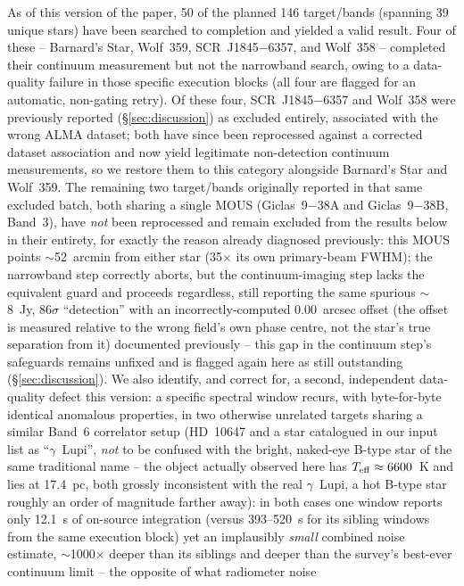 \documentclass{openjournal}
\begin{document}
As of this version of the paper, 50 of the planned 146 target/bands
(spanning 39 unique stars) have been searched to completion and yielded
a valid result. Four of these -- Barnard's Star, Wolf~359,
SCR~J1845$-$6357, and Wolf~358 -- completed their continuum measurement
but not the narrowband search, owing to a data-quality failure in those
specific execution blocks (all four are flagged for an automatic,
non-gating retry). Of these four, SCR~J1845$-$6357 and Wolf~358 were
previously reported (\S\ref{sec:discussion}) as excluded entirely,
associated with the wrong ALMA dataset; both have since been reprocessed
against a corrected dataset association and now yield legitimate
non-detection continuum measurements, so we restore them to this
category alongside Barnard's Star and Wolf~359. The remaining two
target/bands originally reported in that same excluded batch, both
sharing a single MOUS (Giclas~9$-$38A and Giclas~9$-$38B, Band~3), have
\emph{not} been reprocessed and remain excluded from the results below
in their entirety, for exactly the reason already diagnosed previously:
this MOUS points $\sim$52~arcmin from either star (35$\times$ its own
primary-beam FWHM); the narrowband step correctly aborts, but the
continuum-imaging step lacks the equivalent guard and proceeds
regardless, still reporting the same spurious $\sim$8~Jy, 86$\sigma$
``detection'' with an incorrectly-computed 0.00~arcsec offset (the
offset is measured relative to the wrong field's own phase centre, not
the star's true separation from it) documented previously -- this gap in
the continuum step's safeguards remains unfixed and is flagged again
here as still outstanding (\S\ref{sec:discussion}). We also
identify, and correct for, a second, independent data-quality defect
this version: a specific spectral window recurs, with byte-for-byte
identical anomalous properties, in two otherwise unrelated targets
sharing a similar Band~6 correlator setup (HD~10647 and a star catalogued
in our input list as ``$\gamma$~Lupi'', \emph{not} to be confused with
the bright, naked-eye B-type star of the same traditional name --
the object actually observed here has $T_{\rm eff}\approx6600$~K and lies
at 17.4~pc, both grossly inconsistent with the real $\gamma$~Lupi, a hot
B-type star roughly an order of magnitude farther away): in both cases one window reports only 12.1~s of on-source
integration (versus 393--520~s for its sibling windows from the same
execution block) yet an implausibly \emph{small} combined noise estimate,
$\sim$1000$\times$ deeper than its siblings and deeper than the survey's
best-ever continuum limit -- the opposite of what radiometer noise
\end{document}
